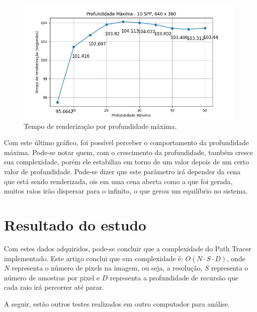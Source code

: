 \documentclass[journal]{IEEEtran}
\begin{document}
\begin{figure}[ht]
  \centering
  \includegraphics[width=\linewidth]{media/Desktop_MD_10SPP_10x.png}
  \caption{Tempo de renderização por profundidade máxima.}
  \label{img_desktop_md2}
\end{figure}

Com este último gráfico, foi possível perceber o comportamento da profundidade máxima. Pode-se notar quem, com o 
crescimento da profundidade, também cresce sua complexidade, porém ele estabiliza em torno de um valor depois de
um certo valor de profundidade. Pode-se dizer que este parâmetro irá depender da cena que está sendo renderizada,
ois em uma cena aberta como a que foi gerada, muitos raios irão dispersar para o infinito, o que gerou um equilíbrio
no sistema.

\section{Resultado do estudo}
Com estes dados adquiridos, pode-se concluir que a complexidade do Path Tracer implementado. Este artigo conclui que
sua complexidade é: $O(N \cdot S \cdot D)$, onde $N$ representa o número de pixels na imagem, ou seja, a resolução,
$S$ representa o número de amostras por pixel e $D$ representa a profundidade de recursão que cada raio irá percorrer
até parar.

A seguir, estão outros testes realizados em outro computador para análise.
\end{document}
